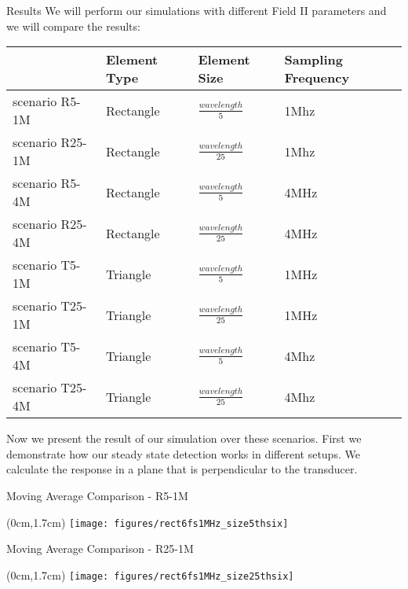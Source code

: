 \documentclass{beamer}
\begin{document}
\begin{frame}{Results}
We will perform our simulations with different Field II parameters and we will compare the results:
\begin{tabularx}{11.30cm}{m{2.5cm}| m{2cm}| m{2cm}|m{2cm}}
\ \ \ \ \ \ \ & \scriptsize{Element Type}  & \scriptsize{Element Size} & \scriptsize{Sampling Frequency}\\
\hline
\scriptsize{scenario R5-1M} & Rectangle & $\frac{wavelength}{5}$  & 1Mhz \\
\scriptsize{scenario R25-1M } & Rectangle & $\frac{wavelength}{25}$ & 1Mhz \\
\scriptsize{scenario R5-4M } & Rectangle & $\frac{wavelength}{5}$ & 4MHz\\
\scriptsize{scenario R25-4M } & Rectangle & $\frac{wavelength}{25}$ & 4MHz\\
\scriptsize{scenario T5-1M } & Triangle & $\frac{wavelength}{5}$ & 1MHz\\
\scriptsize{scenario T25-1M } & Triangle & $\frac{wavelength}{25}$ & 1MHz\\
\scriptsize{scenario T5-4M } & Triangle & $\frac{wavelength}{5}$ & 4Mhz \\
\scriptsize{scenario T25-4M } & Triangle & $\frac{wavelength}{25}$ & 4Mhz \\

\end{tabularx}


\end{frame}

\begin{frame}
Now we present the result of our simulation over these scenarios. First we demonstrate how our steady state detection works in different setups. We calculate the response in a plane that is perpendicular to the transducer.
\end{frame}

\begin{frame}{Moving Average Comparison - R5-1M}
 \begin{textblock*}{13cm}(0cm,1.7cm) %
		\texttt{[image: figures/rect6fs1MHz\_size5thsix]}
 \end{textblock*}   
\end{frame}

\begin{frame}{Moving Average Comparison - R25-1M}
 \begin{textblock*}{13cm}(0cm,1.7cm) %
		\texttt{[image: figures/rect6fs1MHz\_size25thsix]}
 \end{textblock*}   
\end{frame}
\end{document}
